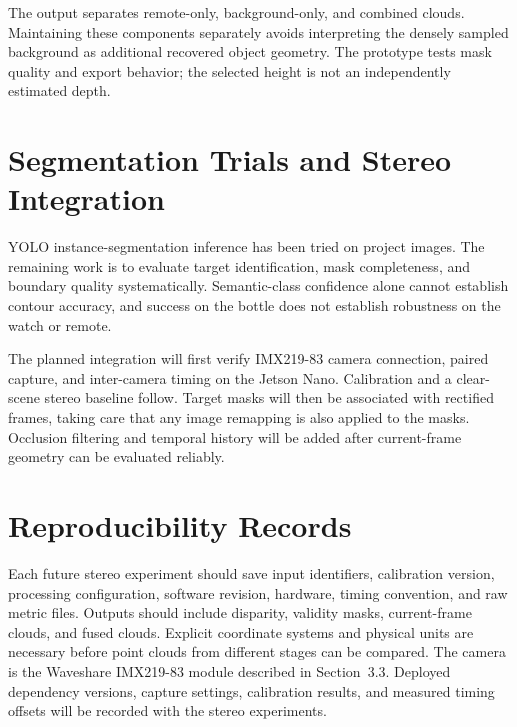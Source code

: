 The output separates remote-only, background-only, and combined clouds. Maintaining these components separately avoids interpreting the densely sampled background as additional recovered object geometry. The prototype tests mask quality and export behavior; the selected height is not an independently estimated depth.

\section{Segmentation Trials and Stereo Integration}
YOLO instance-segmentation inference has been tried on project images. The remaining work is to evaluate target identification, mask completeness, and boundary quality systematically. Semantic-class confidence alone cannot establish contour accuracy, and success on the bottle does not establish robustness on the watch or remote.

The planned integration will first verify IMX219-83 camera connection, paired capture, and inter-camera timing on the Jetson Nano. Calibration and a clear-scene stereo baseline follow. Target masks will then be associated with rectified frames, taking care that any image remapping is also applied to the masks. Occlusion filtering and temporal history will be added after current-frame geometry can be evaluated reliably.

\section{Reproducibility Records}
Each future stereo experiment should save input identifiers, calibration version, processing configuration, software revision, hardware, timing convention, and raw metric files. Outputs should include disparity, validity masks, current-frame clouds, and fused clouds. Explicit coordinate systems and physical units are necessary before point clouds from different stages can be compared. The camera is the Waveshare IMX219-83 module described in Section~3.3. Deployed dependency versions, capture settings, calibration results, and measured timing offsets will be recorded with the stereo experiments.
